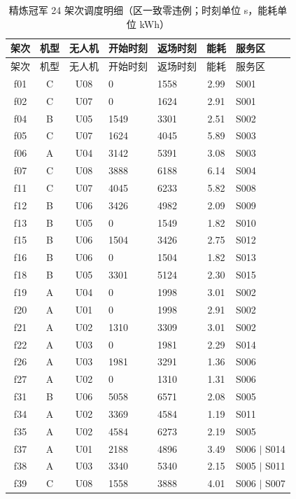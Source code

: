 \begin{longtable}{cccllcl}
\caption{精炼冠军 24 架次调度明细（区一致零违例；时刻单位 s，能耗单位 kWh）}
\label{tab:p2flights}\\
\toprule 架次 & 机型 & 无人机 & 开始时刻 & 返场时刻 & 能耗 & 服务区 \\ \midrule \endfirsthead
\toprule 架次 & 机型 & 无人机 & 开始时刻 & 返场时刻 & 能耗 & 服务区 \\ \midrule \endhead
f01 & C & U08 & 0 & 1558 & 2.99 & S001 \\
f02 & C & U07 & 0 & 1624 & 2.91 & S001 \\
f04 & B & U05 & 1549 & 3301 & 2.51 & S002 \\
f05 & C & U07 & 1624 & 4045 & 5.89 & S003 \\
f06 & A & U04 & 3142 & 5391 & 3.08 & S003 \\
f07 & C & U08 & 3888 & 6188 & 6.14 & S004 \\
f11 & C & U07 & 4045 & 6233 & 5.82 & S008 \\
f12 & B & U06 & 3426 & 4982 & 2.09 & S009 \\
f13 & B & U05 & 0 & 1549 & 1.82 & S010 \\
f15 & B & U06 & 1504 & 3426 & 2.75 & S012 \\
f16 & B & U06 & 0 & 1504 & 1.82 & S013 \\
f18 & B & U05 & 3301 & 5124 & 2.30 & S015 \\
f19 & A & U04 & 0 & 1998 & 3.01 & S002 \\
f20 & A & U01 & 0 & 1998 & 2.91 & S002 \\
f21 & A & U02 & 1310 & 3309 & 3.01 & S002 \\
f22 & A & U03 & 0 & 1981 & 2.29 & S014 \\
f26 & A & U03 & 1981 & 3291 & 1.36 & S006 \\
f27 & A & U02 & 0 & 1310 & 1.31 & S006 \\
f31 & B & U06 & 5058 & 6571 & 2.08 & S005 \\
f34 & A & U02 & 3369 & 4584 & 1.19 & S011 \\
f35 & A & U02 & 4584 & 6273 & 2.19 & S005 \\
f37 & A & U01 & 2188 & 4896 & 3.49 & S006 $|$ S014 \\
f38 & A & U03 & 3340 & 5340 & 2.15 & S005 $|$ S011 \\
f39 & C & U08 & 1558 & 3888 & 4.01 & S006 $|$ S007 \\
\bottomrule
\end{longtable}

